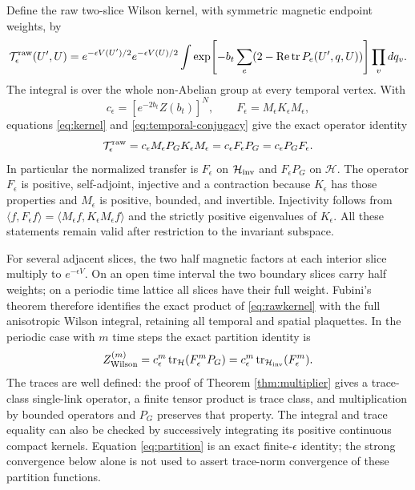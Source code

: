 \documentclass[11pt]{article}
\newcommand{\tr}{\operatorname{tr}}
\newcommand{\Rea}{\operatorname{Re}}
\begin{document}
Define the raw two-slice Wilson kernel, with symmetric magnetic endpoint
weights, by
\begin{equation}\label{eq:rawkernel}
 \mathcal T_\epsilon^{\rm raw}(U',U)
 =e^{-\epsilon V(U')/2}e^{-\epsilon V(U)/2}
 \int\exp\!\left[-b_t\sum_e(2-\Rea\tr P_e(U',q,U))\right]\prod_vdq_v.
\end{equation}
The integral is over the whole non-Abelian group at every temporal
vertex. With
\begin{equation}\label{eq:scalar}
 c_\epsilon=[e^{-2b_t}Z(b_t)]^N,\qquad
 F_\epsilon=M_\epsilon K_\epsilon M_\epsilon,
\end{equation}
equations \eqref{eq:kernel} and \eqref{eq:temporal-conjugacy} give the
exact operator identity
\begin{equation}\label{eq:fulltransfer}
 \mathcal T_\epsilon^{\rm raw}
 =c_\epsilon M_\epsilon P_GK_\epsilon M_\epsilon
 =c_\epsilon F_\epsilon P_G
 =c_\epsilon P_GF_\epsilon.
\end{equation}
In particular the normalized transfer is $F_\epsilon$ on
$\mathcal H_{\rm inv}$ and $F_\epsilon P_G$ on $\mathcal H$.
The operator $F_\epsilon$ is positive, self-adjoint, injective and a
contraction because $K_\epsilon$ has those properties and
$M_\epsilon$ is positive, bounded, and invertible. Injectivity follows
from
$\langle f,F_\epsilon f\rangle=
\langle M_\epsilon f,K_\epsilon M_\epsilon f\rangle$ and the strictly
positive eigenvalues of $K_\epsilon$. All these statements remain
valid after restriction to the invariant subspace.

For several adjacent slices, the two half magnetic factors at each
interior slice multiply to $e^{-\epsilon V}$. On an open time interval
the two boundary slices carry half weights; on a periodic time lattice
all slices have their full weight. Fubini's theorem therefore identifies
the exact product of \eqref{eq:rawkernel} with the full anisotropic
Wilson integral, retaining all temporal and spatial plaquettes. In the
periodic case with $m$ time steps the exact partition identity is
\begin{equation}\label{eq:partition}
 Z_{\rm Wilson}^{(m)}
 =c_\epsilon^m\tr_{\mathcal H}(F_\epsilon^mP_G)
 =c_\epsilon^m\tr_{\mathcal H_{\rm inv}}(F_\epsilon^m).
\end{equation}
The traces are well defined: the proof of Theorem \ref{thm:multiplier}
gives a trace-class single-link operator, a finite tensor product is
trace class, and multiplication by bounded operators and $P_G$ preserves
that property. The integral and trace equality can also be checked by
successively integrating its positive continuous compact kernels.
Equation \eqref{eq:partition} is an exact finite-$\epsilon$ identity;
the strong convergence below alone is not used to assert trace-norm
convergence of these partition functions.
\end{document}

